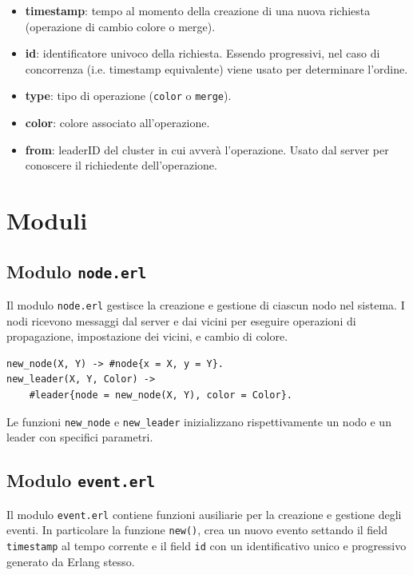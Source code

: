 \documentclass[12pt, a4paper]{report}
\begin{document}
\begin{itemize}
    \item \textbf{timestamp}: tempo al momento della creazione di una nuova richiesta (operazione di cambio colore o merge).
    \item \textbf{id}: identificatore univoco della richiesta. Essendo progressivi, nel caso di concorrenza (i.e. timestamp equivalente) viene usato per determinare l'ordine.
    \item \textbf{type}: tipo di operazione (\texttt{color} o \texttt{merge}).
    \item \textbf{color}: colore associato all'operazione.
    \item \textbf{from}: leaderID del cluster in cui avver\`a l'operazione. Usato dal server per conoscere il richiedente dell'operazione.
\end{itemize}

\section{Moduli}
\subsection{Modulo \texttt{node.erl}}

Il modulo \texttt{node.erl} gestisce la creazione e gestione di ciascun nodo nel sistema. I nodi ricevono messaggi dal server e dai vicini per eseguire operazioni di propagazione, impostazione dei vicini, e cambio di colore. 

\begin{tcolorbox}[title=Creazione di un nodo]
\begin{verbatim}
new_node(X, Y) -> #node{x = X, y = Y}.
new_leader(X, Y, Color) ->
    #leader{node = new_node(X, Y), color = Color}.
\end{verbatim}
\end{tcolorbox}

Le funzioni \texttt{new\_node} e \texttt{new\_leader} inizializzano rispettivamente un nodo e un leader con specifici parametri.

\subsection{Modulo \texttt{event.erl}}

Il modulo \texttt{event.erl} contiene funzioni ausiliarie per la creazione e gestione degli eventi. In particolare la funzione \texttt{new()}, crea un nuovo evento settando il field \texttt{timestamp} al tempo corrente e il field \texttt{id} con un identificativo unico e progressivo generato da Erlang stesso.
\end{document}

